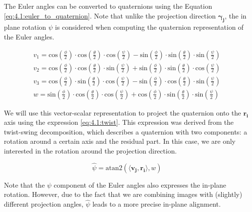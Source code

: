 \documentclass[../main.tex]{subfiles}
\begin{document}
The Euler angles can be converted to quaternions using the Equation \eqref{eq:4.1:euler_to_quaternion}. Note that unlike the projection direction $\bm{\gamma_j}$, the in plane rotation $\psi$ is considered when computing the quaternion representation of the Euler angles.

\begin{equation}\label{eq:4.1:euler_to_quaternion}
\begin{split}
    v_1 = 
    \text{cos}\left( \frac{\phi}{2} \right) \cdot \text{cos}\left( \frac{\theta}{2} \right)  \cdot \text{cos}\left( \frac{\psi}{2} \right) -
    \text{sin}\left( \frac{\phi}{2} \right) \cdot \text{sin}\left( \frac{\theta}{2} \right)  \cdot \text{sin}\left( \frac{\psi}{2} \right) \\
    v_2 = 
    \text{cos}\left( \frac{\phi}{2} \right) \cdot \text{cos}\left( \frac{\theta}{2} \right)  \cdot \text{sin}\left( \frac{\psi}{2} \right) +
    \text{sin}\left( \frac{\phi}{2} \right) \cdot \text{sin}\left( \frac{\theta}{2} \right)  \cdot \text{cos}\left( \frac{\psi}{2} \right) \\
    v_3 = 
    \text{cos}\left( \frac{\phi}{2} \right) \cdot \text{sin}\left( \frac{\theta}{2} \right)  \cdot \text{cos}\left( \frac{\psi}{2} \right) -
    \text{sin}\left( \frac{\phi}{2} \right) \cdot \text{cos}\left( \frac{\theta}{2} \right)  \cdot \text{sin}\left( \frac{\psi}{2} \right) \\
    w = 
    \text{sin}\left( \frac{\phi}{2} \right) \cdot \text{cos}\left( \frac{\theta}{2} \right)  \cdot \text{cos}\left( \frac{\psi}{2} \right) +
    \text{cos}\left( \frac{\phi}{2} \right) \cdot \text{sin}\left( \frac{\theta}{2} \right)  \cdot \text{sin}\left( \frac{\psi}{2} \right)
\end{split}
\end{equation}

We will use this vector-scalar representation to project the quaternion onto the $\bm{r_i}$ axis using the expression \eqref{eq:4.1:twist}. This expression was derived from the twist-swing\cite{chou2018} decomposition, which describes a quaternion with two components: a rotation around a certain axis and the residual part. In this case, we are only interested in the rotation around the projection direction.

\begin{equation}\label{eq:4.1:twist}
    \hat{\psi} = \text{atan2}(\langle \bm{v_j}, \bm{r_i} \rangle, w)
\end{equation}

Note that the $\psi$ component of the Euler angles also expresses the in-plane rotation. However, due to the fact that we are combining images with (slightly) different projection angles, $\hat{\psi}$ leads to a more precise in-plane alignment.
\end{document}
